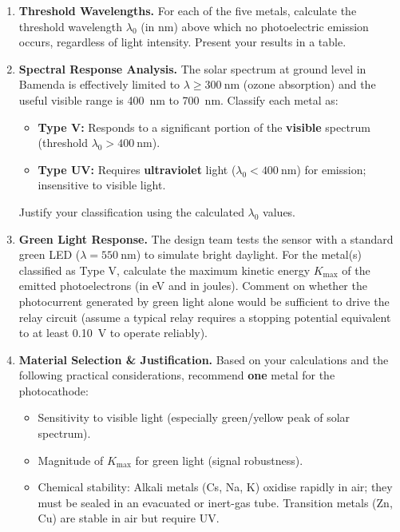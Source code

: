\documentclass[11pt]{article}
\newcounter{popsec}
\newcounter{popsub}
\newcommand{\courssub}[1]{%
  \stepcounter{popsub}%
  \par\vspace{9pt}\noindent{\popxbold\fontsize{11.5}{13}\selectfont\color{popink}{\color{poporange}\thepopsec.\thepopsub}\hspace{6pt}#1}\par\nopagebreak\vspace{4pt}
}
\begin{document}
\courssub{Tasks}
\begin{enumerate}
    \item \textbf{Threshold Wavelengths.} For each of the five metals, calculate the threshold wavelength $\lambda_0$ (in nm) above which no photoelectric emission occurs, regardless of light intensity. Present your results in a table.
    \item \textbf{Spectral Response Analysis.} The solar spectrum at ground level in Bamenda is effectively limited to $\lambda \ge \SI{300}{\nano\meter}$ (ozone absorption) and the useful visible range is \SI{400}{\nano\meter} to \SI{700}{\nano\meter}. Classify each metal as:
    \begin{itemize}
        \item \textbf{Type V:} Responds to a significant portion of the \textbf{visible} spectrum (threshold $\lambda_0 > \SI{400}{\nano\meter}$).
        \item \textbf{Type UV:} Requires \textbf{ultraviolet} light ($\lambda_0 < \SI{400}{\nano\meter}$) for emission; insensitive to visible light.
    \end{itemize}
    Justify your classification using the calculated $\lambda_0$ values.
    \item \textbf{Green Light Response.} The design team tests the sensor with a standard green LED ($\lambda = \SI{550}{\nano\meter}$) to simulate bright daylight. For the metal(s) classified as Type V, calculate the maximum kinetic energy $K_{\text{max}}$ of the emitted photoelectrons (in eV and in joules). Comment on whether the photocurrent generated by green light alone would be sufficient to drive the relay circuit (assume a typical relay requires a stopping potential equivalent to at least \SI{0.10}{\volt} to operate reliably).
    \item \textbf{Material Selection \& Justification.} Based on your calculations and the following practical considerations, recommend \textbf{one} metal for the photocathode:
    \begin{itemize}
        \item Sensitivity to visible light (especially green/yellow peak of solar spectrum).
        \item Magnitude of $K_{\text{max}}$ for green light (signal robustness).
        \item Chemical stability: Alkali metals (Cs, Na, K) oxidise rapidly in air; they must be sealed in an evacuated or inert-gas tube. Transition metals (Zn, Cu) are stable in air but require UV.
    \end{itemize}

\end{enumerate}
\end{document}
